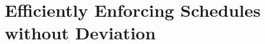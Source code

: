 
\newcommand{\bddbddb}{\vv{bddbddb}\xspace}
\newcommand{\peregrinenprog}[0]{18\xspace}

\chapter{Efficiently Enforcing Schedules without Deviation} \label{sec:peregrine}












